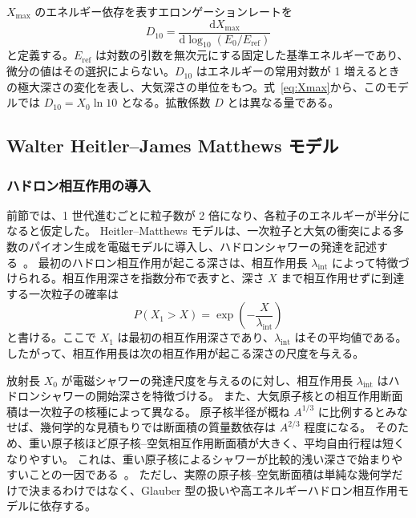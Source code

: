\documentclass[book,paper=a4,fontsize=11pt]{jlreq}
\begin{document}
\(X_{\max}\) のエネルギー依存を表すエロンゲーションレートを
\begin{equation}
  D_{10}=\frac{\mathrm d X_{\max}}{\mathrm d\log_{10}(E_0/E_{\mathrm{ref}})}
\end{equation}
と定義する。\(E_{\mathrm{ref}}\) は対数の引数を無次元にする固定した基準エネルギーであり、微分の値はその選択によらない。\(D_{10}\) はエネルギーの常用対数が 1 増えるときの極大深さの変化を表し、大気深さの単位をもつ。式~\eqref{eq:Xmax}から、このモデルでは \(D_{10}=X_0\ln10\) となる。拡散係数 \(D\) とは異なる量である。

\subsection{Walter Heitler--James Matthews モデル}\label{subsec:heitler_matthews}

\subsubsection{ハドロン相互作用の導入}
前節では、1 世代進むごとに粒子数が 2 倍になり、各粒子のエネルギーが半分になると仮定した。
Heitler--Matthews モデルは、一次粒子と大気の衝突による多数のパイオン生成を電磁モデルに導入し、ハドロンシャワーの発達を記述する~\cite{Matthews2005,Montanus2013}。
最初のハドロン相互作用が起こる深さは、相互作用長 \(\lambda_{\mathrm{int}}\) によって特徴づけられる。相互作用深さを指数分布で表すと、深さ \(X\) まで相互作用せずに到達する一次粒子の確率は
\begin{equation}
  P(X_1>X)=\exp\!\left(-\frac{X}{\lambda_{\mathrm{int}}}\right)
\end{equation}
と書ける。ここで \(X_1\) は最初の相互作用深さであり、\(\lambda_{\mathrm{int}}\) はその平均値である。したがって、相互作用長は次の相互作用が起こる深さの尺度を与える。

放射長 \(X_0\) が電磁シャワーの発達尺度を与えるのに対し、相互作用長 \(\lambda_{\mathrm{int}}\) はハドロンシャワーの開始深さを特徴づける。
また、大気原子核との相互作用断面積は一次粒子の核種によって異なる。
原子核半径が概ね \(A^{1/3}\) に比例するとみなせば、幾何学的な見積もりでは断面積の質量数依存は \(A^{2/3}\) 程度になる。
そのため、重い原子核ほど原子核--空気相互作用断面積が大きく、平均自由行程は短くなりやすい。
これは、重い原子核によるシャワーが比較的浅い深さで始まりやすいことの一因である~\cite{Matthews2005,Stanev2004,PDGCosmicRays}。
ただし、実際の原子核--空気断面積は単純な幾何学だけで決まるわけではなく、Glauber 型の扱いや高エネルギーハドロン相互作用モデルに依存する。
\end{document}
